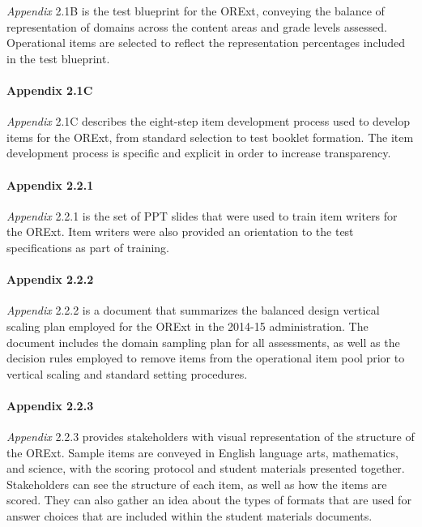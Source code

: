 \documentclass[]{article}
\let\oldparagraph\paragraph
\renewcommand{\paragraph}[1]{\oldparagraph{#1}\mbox{}}
\begin{document}
\emph{Appendix} 2.1B is the test blueprint for the ORExt, conveying the
balance of representation of domains across the content areas and grade
levels assessed. Operational items are selected to reflect the
representation percentages included in the test blueprint.

\paragraph{Appendix 2.1C}\label{appendix-2.1c}

\emph{Appendix} 2.1C describes the eight-step item development process
used to develop items for the ORExt, from standard selection to test
booklet formation. The item development process is specific and explicit
in order to increase transparency.

\paragraph{Appendix 2.2.1}\label{appendix-2.2.1}

\emph{Appendix} 2.2.1 is the set of PPT slides that were used to train
item writers for the ORExt. Item writers were also provided an
orientation to the test specifications as part of training.

\paragraph{Appendix 2.2.2}\label{appendix-2.2.2}

\emph{Appendix} 2.2.2 is a document that summarizes the balanced design
vertical scaling plan employed for the ORExt in the 2014-15
administration. The document includes the domain sampling plan for all
assessments, as well as the decision rules employed to remove items from
the operational item pool prior to vertical scaling and standard setting
procedures.

\paragraph{Appendix 2.2.3}\label{appendix-2.2.3}

\emph{Appendix} 2.2.3 provides stakeholders with visual representation
of the structure of the ORExt. Sample items are conveyed in English
language arts, mathematics, and science, with the scoring protocol and
student materials presented together. Stakeholders can see the structure
of each item, as well as how the items are scored. They can also gather
an idea about the types of formats that are used for answer choices that
are included within the student materials documents.
\end{document}
